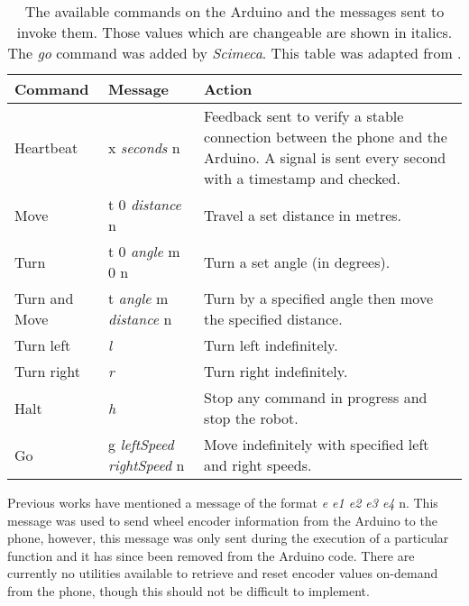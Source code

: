 \documentclass[a4paper,12pt]{article}
\begin{document}
\begin{center}
  \begin{table}
    \begin{tabular}{ | l | l | p{7cm} | }

      \hline
      \textbf{Command} & \textbf{Message} & \textbf{Action} \\ \hline
      
      Heartbeat & x \textit{seconds} n &   Feedback sent to verify a stable connection between the
                                           phone and the Arduino. A signal is sent every second with a
                                           timestamp and checked. \\ \hline

      Move & t 0 \textit{distance} n & Travel a set distance in metres. \\  \hline
      Turn & t 0 \textit{angle} m 0 n & Turn a set angle (in degrees). \\ \hline
      Turn and Move & t \textit{angle} m \textit{distance} n & Turn by a specified angle then move the
                                                               specified distance. \\ \hline
      Turn left & \textit{l} & Turn left indefinitely. \\ \hline
      Turn right & \textit{r} & Turn right indefinitely. \\ \hline
      Halt & \textit{h} & Stop any command in progress and stop the robot. \\ \hline
      Go & g \textit{leftSpeed} \textit{rightSpeed} n & Move indefinitely with specified left and
                                                        right speeds. \\ \hline
                               
      
      \hline
      


      
    \end{tabular}
    \caption{The available commands on the Arduino and the messages sent to invoke them. Those
      values which are changeable are shown in italics. The \textit{go} command was added by
      \textit{Scimeca}. This table was adapted from \cite{Eberding2016, Scimeca2017}.
    }
    \label{tab:commands}
  \end{table}
\end{center}

Previous works have mentioned a message of the format \textit{e e1 e2 e3 e4} n. This message was used
to send wheel encoder information from the Arduino to the phone, however, this message was only sent
during the execution of a particular function and it has since been removed from the Arduino code.
There are currently no utilities available to retrieve and reset encoder values on-demand from the
phone, though this should not be difficult to implement.
\end{document}
